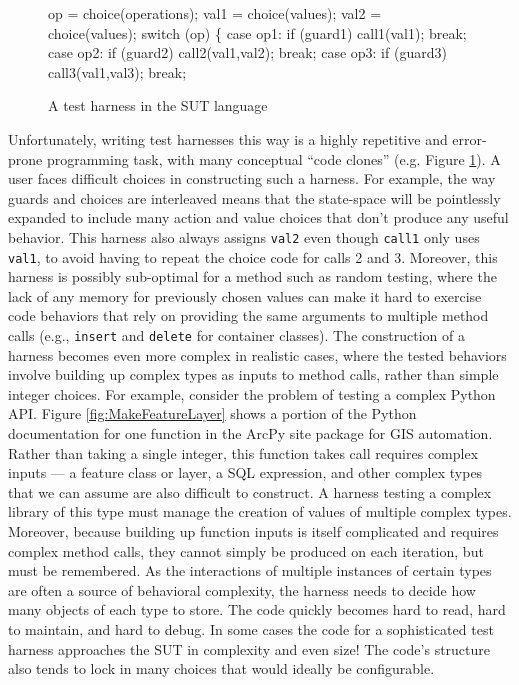 \begin{figure}[t]
{\scriptsize
\begin{code}
op = choice(operations);
val1 = choice(values);
val2 = choice(values);
switch (op) \{
case op1:  if (guard1)
              call1(val1);
           break;
case op2:  if (guard2)
              call2(val1,val2);
           break;
case op3:  if (guard3)
              call3(val1,val3);
           break;
\end{code}
}
\vspace{-0.15in}
\caption {A test harness in the SUT language}
\label{fig:badharness}
\end{figure}



Unfortunately, writing test harnesses this way is a highly repetitive
and error-prone programming task, with many conceptual ``code clones''
(e.g. Figure \ref{fig:badharness}). A user faces difficult choices in
constructing such a harness. For example, the way guards and choices
are interleaved means that the state-space will be pointlessly
expanded to include many action and value choices that don't produce
any useful behavior.  This harness also always assigns {\tt val2} even
though {\tt call1} only uses {\tt val1}, to avoid having to repeat the
choice code for calls 2 and 3.  Moreover, this harness is possibly
sub-optimal for a method such as random testing, where the lack of any
memory for previously chosen values can make it hard to exercise code
behaviors that rely on providing the same arguments to multiple method
calls (e.g., {\tt insert} and {\tt delete} for container classes).
The construction of a harness becomes even more complex in realistic
cases, where the tested behaviors involve building up complex types as
inputs to method calls, rather than simple integer choices. For
example, consider the problem of testing a complex Python API.  Figure
\ref{fig:MakeFeatureLayer} shows a portion of the Python documentation for one function in the ArcPy site
package for GIS automation.  Rather than taking a single integer, this
function takes call requires complex inputs --- a feature class or
layer, a SQL expression, and other complex types that we can assume
are also difficult to construct.  A harness testing a complex library
of this type must manage the creation of values of multiple complex types.
Moreover, because building up function inputs is itself complicated
and requires complex method calls, they cannot simply be produced on each iteration, but must be
remembered.  As the interactions of multiple instances of certain
types are often a source of behavioral complexity,
the harness needs to decide how many objects of each type to store.
The code quickly becomes hard to read, hard to maintain, and hard to
debug.  In some cases \cite{AMAI} the code for a sophisticated test
harness approaches the SUT in complexity and even size!  The code's
structure also tends to lock in many choices that would ideally be configurable.

